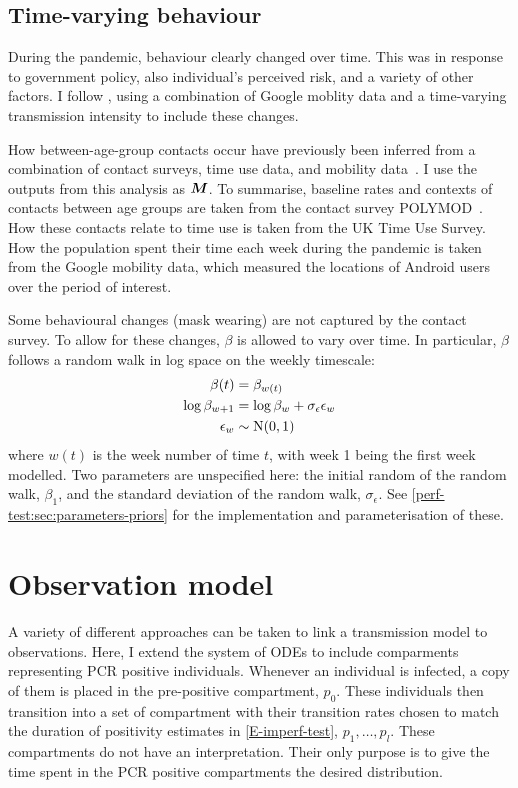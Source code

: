 \documentclass[thesis.tex]{subfiles}
\begin{document}
\subsection{Time-varying behaviour} \label{SEIR:sec:time-varying-foi}

During the pandemic, behaviour clearly changed over time.
This was in response to government policy, also individual's perceived risk, and a variety of other factors.
I follow \textcite{birrellRealtime}, using a combination of Google moblity data and a time-varying transmission intensity to include these changes.

How between-age-group contacts occur have previously been inferred from a combination of contact surveys, time use data, and mobility data~\autocites{vanleeuwenTime}{vanleeuwenAugmenting}.
I use the outputs from this analysis as $\bm{M}$.
To summarise, baseline rates and contexts of contacts between age groups are taken from the contact survey POLYMOD~\autocite{mossongSocial}.
How these contacts relate to time use is taken from the UK Time Use Survey.
How the population spent their time each week during the pandemic is taken from the Google mobility data, which measured the locations of Android users over the period of interest.

Some behavioural changes (\eg mask wearing) are not captured by the contact survey.
To allow for these changes, $\beta$ is allowed to vary over time.
In particular, $\beta$ follows a random walk in log space on the weekly timescale:
\begin{align}
    \beta(t) &= \beta_{w(t)} \\
    \log\beta_{w+1} &= \log\beta_w + \sigma_\epsilon \epsilon_w \\
    \epsilon_w &\sim \operatorname{N}(0, 1)
\end{align}
where $w(t)$ is the week number of time $t$, with week 1 being the first week modelled.
Two parameters are unspecified here: the initial random of the random walk, $\beta_1$, and the standard deviation of the random walk, $\sigma_\epsilon$.
See \cref{perf-test:sec:parameters-priors} for the implementation and parameterisation of these.

\section{Observation model} \label{SEIR:sec:observation}

A variety of different approaches can be taken to link a transmission model to observations.
Here, I extend the system of ODEs to include comparments representing PCR positive individuals.
Whenever an individual is infected, a copy of them is placed in the pre-positive compartment, $p_0$.
These individuals then transition into a set of compartment with their transition rates chosen to match the duration of positivity estimates in \cref{E-imperf-test}, $p_1, \dots, p_l$.
These compartments do not have an interpretation.
Their only purpose is to give the time spent in the PCR positive compartments the desired distribution.
\end{document}

